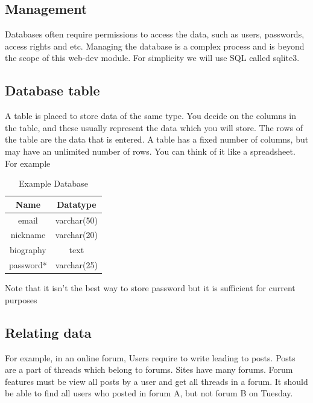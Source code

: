\documentclass[a4paper]{article}
\theoremstyle{plain}
\theoremstyle{definition}
\newtheorem{exmp}{Example}[section]
\theoremstyle{remark}
\begin{document}
\begin{flushleft}
\subsection{Management}
Databases often require permissions to access the data, such as users, passwords, access rights and etc. Managing the database is a complex process and is beyond the scope of this web-dev module. For simplicity we will use SQL called sqlite3. 
\subsection{Database table}
A table is placed to store data of the same type. You decide on the columns in the table, and these usually represent the data which you will store. The rows of the table are the data that is entered. A table has a fixed number of columns, but may have an unlimited number of rows. You can think of it like a spreadsheet. 
\\ For example
\begin{tcolorbox}[colback=black!3!white,colframe=black!60!white,title=\begin{exmp}Creating users table \label{Creating users table}\end{exmp}]
        
\begin{table}[H]
	\centering
	\caption{Example Database}
	\label{tab:database}
	\begin{tabular}{|c|c|}
		\hline
	Name &  Datatype \\
	\hline
	email & varchar(50) \\
	nickname & varchar(20) \\
	biography & text \\
	password* & varchar(25)\\
	\hline
	\end{tabular}
\end{table}
\end{tcolorbox}
Note that it isn't the best way to store password but it is sufficient for current purposes
\subsection{Relating data}
For example, in an online forum, Users require to write leading to posts. Posts are a part of threads which belong to forums. Sites have many forums. Forum features must be view all posts by a user and get all threads in a forum. It should be able to find all users who posted in forum A, but not forum B on Tuesday.

\end{flushleft}
\end{document}
